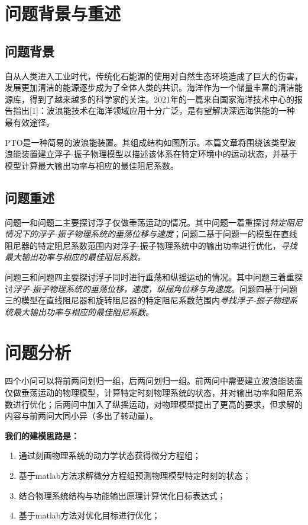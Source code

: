 \documentclass[12pt,utf8]{article}
\begin{document}
\clearpage

\section{问题背景与重述}

\subsection{问题背景}

自从人类进入工业时代，传统化石能源的使用对自然生态环境造成了巨大的伤害，发展更加清洁的能源逐步成为了全体人类的共识。海洋作为一个储量丰富的清洁能源库，得到了越来越多的科学家的关注。2021年的一篇来自国家海洋技术中心的报告指出[1]：波浪能技术在海洋领域应用十分广泛，是有望解决深远海供能的一种最有效途径。

PTO是一种简易的波浪能装置。其组成结构如图所示。本篇文章将围绕该类型波浪能装置建立浮子-振子物理模型以描述该体系在特定环境中的运动状态，并基于模型计算最大输出功率与相应的最佳阻尼系数。

   
\subsection{问题重述}
   问题一和问题二主要探讨浮子\textsf{仅做垂荡运动}的情况。其中问题一着重探讨\textit{特定阻尼情况下的浮子-振子物理系统的垂荡位移与速度}；问题二基于问题一的模型在直线阻尼器的特定阻尼系数范围内对浮子-振子物理系统中的输出功率进行优化，\textit{寻找最大输出功率与相应的最佳阻尼系数。}
   
   问题三和问题四主要探讨浮子\textsf{同时进行垂荡和纵摇运动}的情况。其中问题三着重探讨\textit{浮子-振子物理系统的垂荡位移，速度，纵摇角位移与角速度}。问题四基于问题三的模型在直线阻尼器和旋转阻尼器的特定阻尼系数范围内\textit{寻找浮子-振子物理系统最大输出功率与相应的最佳阻尼系数。}

\section{问题分析}
四个小问可以将前两问划归一组，后两问划归一组。前两问中需要建立波浪能装置仅做垂荡运动的物理模型，计算特定时刻物理系统的状态，并对输出功率和阻尼系数进行优化；后两问中加入了纵摇运动，对物理模型提出了更高的要求，但求解的内容与前两问大同小异（多出了转动量）。

\textbf{我们的建模思路是：}
\begin{enumerate}
	\item 通过刻画物理系统的动力学状态获得微分方程组；
	\item 基于matlab方法求解微分方程组预测物理模型特定时刻的状态；
	\item 结合物理系统结构与功能输出原理计算优化目标表达式；
	\item 基于matlab方法对优化目标进行优化；
\end{enumerate}
\end{document}

